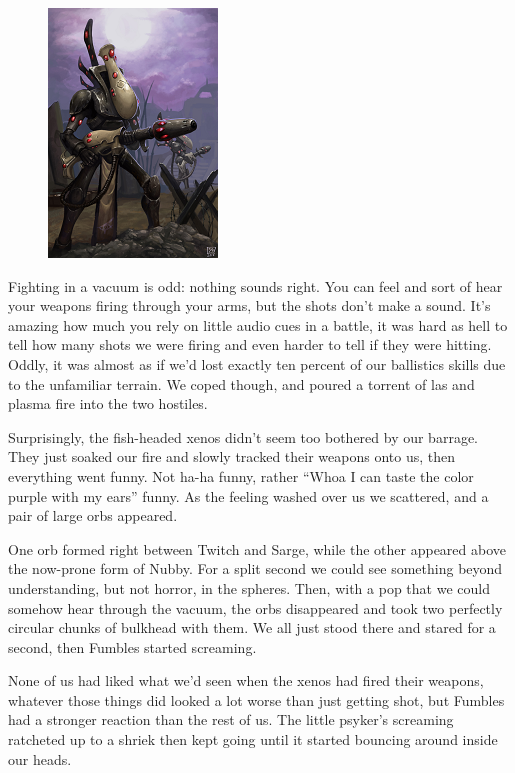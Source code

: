 \begin{figure}
	\begin{center}
		\includegraphics[width=\figwidth]{pics/11/50.png}
	\end{center}
\end{figure}
Fighting in a vacuum is odd: 
nothing sounds right. 
You can feel and sort of hear your weapons firing through your arms, but the shots don’t make a sound. 
It’s amazing how much you rely on little audio cues in a battle, it was hard as hell to tell how many shots we were firing and even harder to tell if they were hitting. 
Oddly, it was almost as if we’d lost exactly ten percent of our ballistics skills due to the unfamiliar terrain. 
We coped though, and poured a torrent of las and plasma fire into the two hostiles.
 
Surprisingly, the fish-headed xenos didn’t seem too bothered by our barrage. 
They just soaked our fire and slowly tracked their weapons onto us, then everything went funny. 
Not ha-ha funny, rather “Whoa I can taste the color purple with my ears” funny. 
As the feeling washed over us we scattered, and a pair of large orbs appeared. 


One orb formed right between Twitch and Sarge, while the other appeared above the now-prone form of Nubby. 
For a split second we could see something beyond understanding, but not horror, in the spheres. 
Then, with a pop that we could somehow hear through the vacuum, the orbs disappeared and took two perfectly circular chunks of bulkhead with them. 
We all just stood there and stared for a second, then Fumbles started screaming.

None of us had liked what we'd seen when the xenos had fired their weapons, whatever those things did looked a lot worse than just getting shot, but Fumbles had a stronger reaction than the rest of us. 
The little psyker's screaming ratcheted up to a shriek then kept going until it started bouncing around inside our heads.

